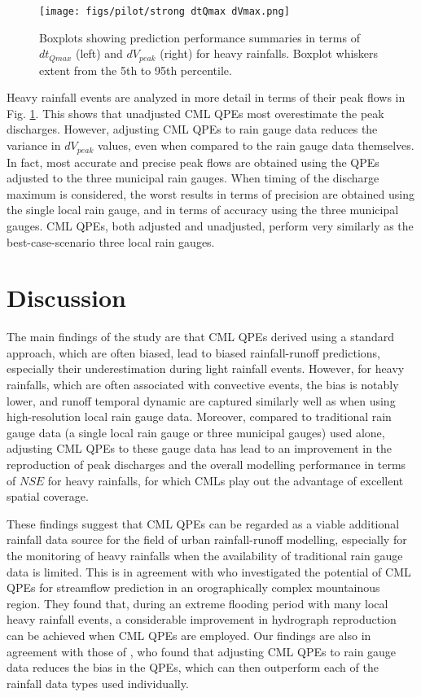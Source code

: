 \documentclass{ctuthesis}\usepackage[]{graphicx}\usepackage[]{color}
\begin{document}
\begin{figure}[H]
\begin{center}
\texttt{[image: figs/pilot/strong dtQmax dVmax.png]}
\caption{Boxplots showing prediction performance summaries in terms of $dt_{Qmax}$ (left) and $dV_{peak}$ (right) for heavy rainfalls. Boxplot whiskers extent from the 5th to 95th percentile.} \label{pil_fig3}
\end{center}
\end{figure}

Heavy rainfall events are analyzed in more detail in terms of their peak flows in Fig. \ref{pil_fig3}. This shows that unadjusted CML QPEs most overestimate the peak discharges. However, adjusting CML QPEs to rain gauge data reduces the variance in $dV_{peak}$ values, even when compared to the rain gauge data themselves. In fact, most accurate and precise peak flows are obtained using the QPEs adjusted to the three municipal rain gauges. When timing of the discharge maximum is considered, the worst results in terms of precision are obtained using the single local rain gauge, and in terms of accuracy using the three municipal gauges. CML QPEs, both adjusted and unadjusted, perform very similarly as the best-case-scenario three local rain gauges.



\section{Discussion}

The main findings of the study are that CML QPEs derived using a standard approach, which are often biased, lead to biased rainfall-runoff predictions, especially their underestimation during light rainfall events. However, for heavy rainfalls, which are often associated with convective events, the bias is notably lower, and runoff temporal dynamic are captured similarly well as when using high-resolution local rain gauge data. Moreover, compared to traditional rain gauge data (a single local rain gauge or three municipal gauges) used alone, adjusting CML QPEs to these gauge data has lead to an improvement in the reproduction of peak discharges and the overall modelling performance in terms of $N\!S\!E$ for heavy rainfalls, for which CMLs play out the advantage of excellent spatial coverage. 

These findings suggest that CML QPEs can be regarded as a viable additional rainfall data source for the field of urban rainfall-runoff modelling, especially for the monitoring of heavy rainfalls when the availability of traditional rain gauge data is limited. This is in agreement with \cite{smiatekPotentialCommercialMicrowave2017} who investigated the potential of CML QPEs for streamflow prediction in an orographically complex mountainous region. They found that, during an extreme flooding period with many local heavy rainfall events, a considerable improvement in hydrograph reproduction can be achieved when CML QPEs are employed. Our findings are also in agreement with those of \cite{fenclGaugeadjustedRainfallEstimates2017}, who found that adjusting CML QPEs to rain gauge data reduces the bias in the QPEs, which can then outperform each of the rainfall data types used individually.
\end{document}
